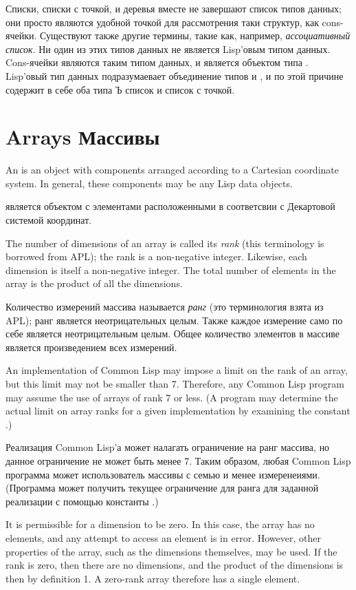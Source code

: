 Списки, списки с точкой, и деревья вместе не завершают список типов данных;
они просто являются удобной точкой для рассмотрения таки структур, как
cons-ячейки.
Существуют также другие термины, такие как, например, {\it ассоциативный
  список}. Ни один из этих типов данных не является Lisp'овым типом
данных. Cons-ячейки являются таким типом данных, и {\nil} является объектом типа
. Lisp'овый тип данных  подразумаевает объединение типов
 и , и по этой причине содержит в себе оба типа Ъ
список и список с точкой.

\section{Arrays Массивы}
\label{ARRAY-TYPE-SECTION}

An  is an object with components arranged according
to a Cartesian coordinate system.
In general, these components may be any Lisp data objects.

 является объектом с элементами расположенными в соответсвии с
Декартовой системой координат.

The number of dimensions of an array is called its {\it rank}
(this terminology is borrowed from APL);
the rank is a non-negative integer.
Likewise, each dimension is itself a non-negative integer.
The total number of elements in the array is the product of all the
dimensions.

Количество измерений массива называется {\it ранг} (это терминология взята из
APL); ранг является неотрицательных целым.
Также каждое измерение само по себе является неотрицательным целым.
Общее количество элементов в массиве является произведением всех измерений.

An implementation of Common Lisp may impose a limit on the rank of an array,
but this limit may not be smaller than 7.  Therefore, any Common Lisp
program may assume the use of arrays of rank 7 or less.
(A program may determine the actual limit on array ranks for
a given implementation by examining the constant .)

Реализация Common Lisp'а может налагать ограничение на ранг массива, но данное
ограничение не может быть менее 7. Таким образом, любая Common Lisp программа
может использователь массивы с семью и менее измеренеиями.
(Программа может получить текущее ограничение для ранга для заданной реализации
с помощью константы .)

It is permissible for a dimension to be zero.  In this case,
the array has no elements, and any attempt to access an element
is in error.  However, other properties of the array, such as the
dimensions themselves, may be used.
If the rank is zero, then there are no dimensions, and the
product of the dimensions is then by definition 1.
A zero-rank array therefore has a single element.

